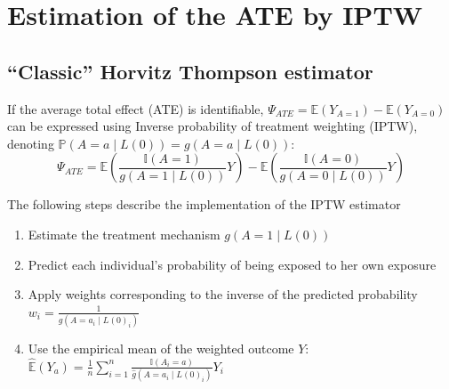 \documentclass[
]{book}
\begin{document}
\section{Estimation of the ATE by IPTW}\label{estimation-of-the-ate-by-iptw}

\subsection{``Classic'' Horvitz Thompson estimator}\label{classic-horvitz-thompson-estimator}

If the average total effect (ATE) is identifiable, \(\Psi_{ATE} = \mathbb{E}(Y_{A=1}) - \mathbb{E}(Y_{A=0})\) can be expressed using Inverse probability of treatment weighting (IPTW), denoting \(\mathbb{P}(A=a \mid L(0)) = g(A=a \mid L(0))\):
\begin{equation}
\Psi_{ATE} = \mathbb{E}\left( \frac{\mathbb{I}(A=1)}{g(A=1 \mid L(0))} Y \right) - \mathbb{E}\left( \frac{\mathbb{I}(A=0)}{g(A=0 \mid L(0))} Y \right)
\end{equation}

The following steps describe the implementation of the IPTW estimator

\begin{enumerate}
\def\labelenumi{\arabic{enumi}.}
\item
  Estimate the treatment mechanism \(g(A=1 \mid L(0))\)
\item
  Predict each individual's probability of being exposed to her own exposure
\item
  Apply weights corresponding to the inverse of the predicted probability \(w_i = \frac{1}{\hat{g}(A = a_i \mid L(0)_i)}\)
\item
  Use the empirical mean of the weighted outcome \(Y\): \(\hat{\mathbb{E}}(Y_a) = \frac{1}{n} \sum_{i=1}^n \frac{\mathbb{I}(A_i=a)}{\hat{g}(A=a_i \mid L(0)_i)} Y_i\)
\end{enumerate}
\end{document}
